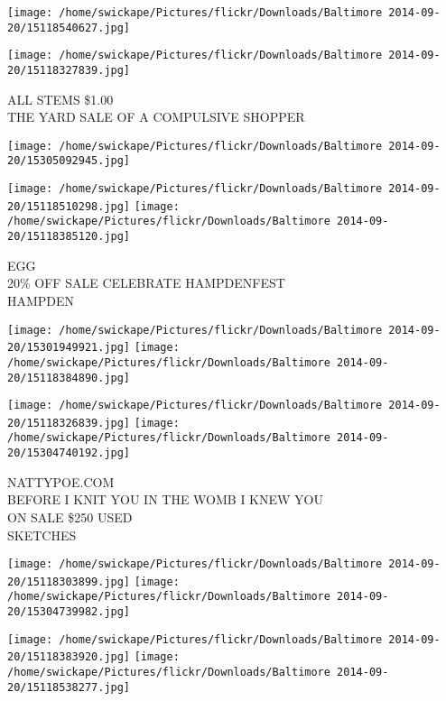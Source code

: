 \documentclass[10pt,letterpaper]{article}
\begin{document}
\texttt{[image: /home/swickape/Pictures/flickr/Downloads/Baltimore 2014-09-20/15118540627.jpg]}

\vspace{0.25in}
\texttt{[image: /home/swickape/Pictures/flickr/Downloads/Baltimore 2014-09-20/15118327839.jpg]}

ALL STEMS \$1.00\\
THE YARD SALE OF A COMPULSIVE SHOPPER\\
\pagebreak

\texttt{[image: /home/swickape/Pictures/flickr/Downloads/Baltimore 2014-09-20/15305092945.jpg]}

\vspace{0.25in}
\texttt{[image: /home/swickape/Pictures/flickr/Downloads/Baltimore 2014-09-20/15118510298.jpg]}
\texttt{[image: /home/swickape/Pictures/flickr/Downloads/Baltimore 2014-09-20/15118385120.jpg]}

EGG\\
20\% OFF SALE CELEBRATE HAMPDENFEST\\
HAMPDEN\\
\pagebreak

\texttt{[image: /home/swickape/Pictures/flickr/Downloads/Baltimore 2014-09-20/15301949921.jpg]}
\texttt{[image: /home/swickape/Pictures/flickr/Downloads/Baltimore 2014-09-20/15118384890.jpg]}

\texttt{[image: /home/swickape/Pictures/flickr/Downloads/Baltimore 2014-09-20/15118326839.jpg]}
\texttt{[image: /home/swickape/Pictures/flickr/Downloads/Baltimore 2014-09-20/15304740192.jpg]}

NATTYPOE.COM\\
BEFORE I KNIT YOU IN THE WOMB I KNEW YOU\\
ON SALE \$250 USED\\
SKETCHES\\
\pagebreak

\texttt{[image: /home/swickape/Pictures/flickr/Downloads/Baltimore 2014-09-20/15118303899.jpg]}
\texttt{[image: /home/swickape/Pictures/flickr/Downloads/Baltimore 2014-09-20/15304739982.jpg]}

\texttt{[image: /home/swickape/Pictures/flickr/Downloads/Baltimore 2014-09-20/15118383920.jpg]}
\texttt{[image: /home/swickape/Pictures/flickr/Downloads/Baltimore 2014-09-20/15118538277.jpg]}
\end{document}

